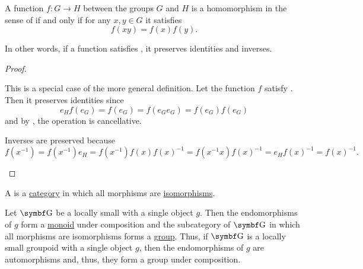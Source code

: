 \begin{proposition}\label{thm:group_homomorphism_single_condition}
  A function \( f: G \to H \) between the groups \( G \) and \( H \) is a homomorphism in the sense of  if and only if for any \( x, y \in G \) it satisfies
  \begin{equation}\label{thm:group_homomorphism_single_condition/condition}
    f(xy) = f(x) f(y).
  \end{equation}

  In other words, if a function satisfies , it preserves identities and inverses.
\end{proposition}
\begin{proof}\mbox{}
  \begin{description}
    \Implies This is a special case of the more general definition.
    \ImpliedBy Let the function \( f \) satisfy . Then it preserves identities since
    \begin{equation*}
      e_H f(e_G) = f(e_G) = f(e_G e_G) = f(e_G) f(e_G)
    \end{equation*}
    and by , the operation is cancellative.

    Inverses are preserved because
    \begin{equation*}
      f(x^{-1})
      =
      f(x^{-1}) e_H
      =
      f(x^{-1}) f(x) f(x)^{-1}
      =
      f(x^{-1} x) f(x)^{-1}
      =
      e_H f(x)^{-1}
      =
      f(x)^{-1}.
    \end{equation*}
  \end{description}
\end{proof}

\begin{definition}\label{def:groupoid}
  A  is a \hyperref[def:category]{category} in which all morphisms are \hyperref[def:morphism_invertibility]{isomorphisms}.
\end{definition}

\begin{definition}\label{remark:groupoids}
  Let \( \Bold G \) be a locally small with a single object \( g \). Then the endomorphisms of \( g \) form a \hyperref[def:magma]{monoid} under composition and the subcategory of \( \Bold G \) in which all morphisms are isomorphisms forms a \hyperref[def:magma]{group}. Thus, if \( \Bold G \) is a locally small groupoid with a single object \( g \), then the endomorphisms of \( g \) are automorphisms and, thus, they form a group under composition.
\end{definition}

